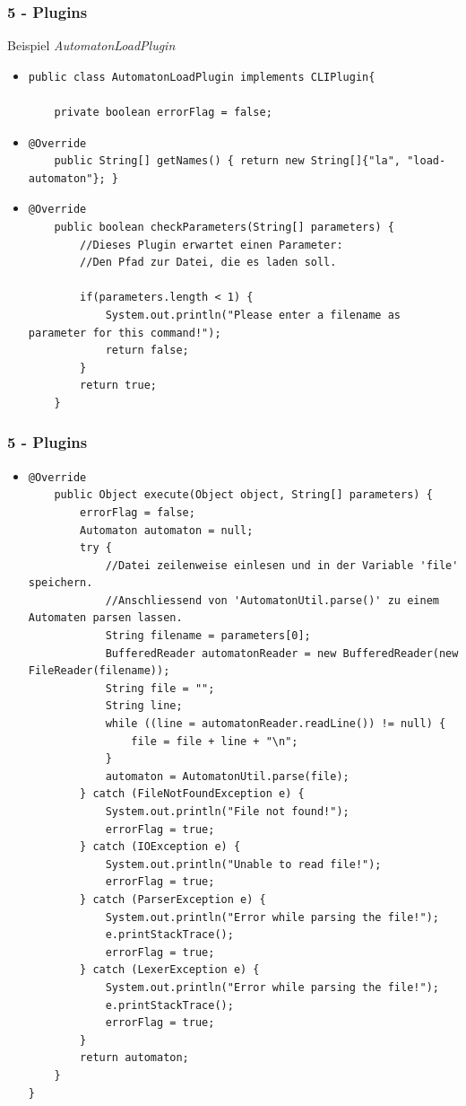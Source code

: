 \documentclass[9pt, xcolor={dvipsnames}]{beamer}
\begin{document}
\begin{frame}[fragile]\frametitle{5 - Plugins}
	{ \fontsize{12}{12} \selectfont Beispiel \textit{AutomatonLoadPlugin}}
	\pause
	\begin{itemize}
		\item[]
		\begin{lstlisting}[frame=single, basicstyle=\tiny]
public class AutomatonLoadPlugin implements CLIPlugin{

	private boolean errorFlag = false;
		\end{lstlisting}
		\pause
		\item[]
		\begin{lstlisting}[frame=single, basicstyle=\tiny]
	@Override
	public String[] getNames() { return new String[]{"la", "load-automaton"}; }
		\end{lstlisting}
		\pause
		\item[]
		\begin{lstlisting}[frame=single, basicstyle=\tiny]
	@Override
	public boolean checkParameters(String[] parameters) {
		//Dieses Plugin erwartet einen Parameter:
		//Den Pfad zur Datei, die es laden soll.
		
		if(parameters.length < 1) {
			System.out.println("Please enter a filename as parameter for this command!");
			return false;
		}
		return true;
	}
		\end{lstlisting}
	\end{itemize}
\end{frame}

\begin{frame}[fragile]\frametitle{5 - Plugins}
	\begin{itemize}
		\item[]
		\begin{lstlisting}[frame=single, basicstyle=\tiny]
    @Override
	public Object execute(Object object, String[] parameters) {
		errorFlag = false;
		Automaton automaton = null;
		try {
			//Datei zeilenweise einlesen und in der Variable 'file' speichern.
			//Anschliessend von 'AutomatonUtil.parse()' zu einem Automaten parsen lassen.
			String filename = parameters[0];
			BufferedReader automatonReader = new BufferedReader(new FileReader(filename));
			String file = "";
			String line;
			while ((line = automatonReader.readLine()) != null) {
				file = file + line + "\n";
			}
			automaton = AutomatonUtil.parse(file);
		} catch (FileNotFoundException e) {
			System.out.println("File not found!");
			errorFlag = true;
		} catch (IOException e) {
			System.out.println("Unable to read file!");
			errorFlag = true;
		} catch (ParserException e) {
			System.out.println("Error while parsing the file!");
			e.printStackTrace();
			errorFlag = true;
		} catch (LexerException e) {
			System.out.println("Error while parsing the file!");
			e.printStackTrace();
			errorFlag = true;
		}
		return automaton;
	}
}
		\end{lstlisting}
	\end{itemize}
\end{frame}
\end{document}
